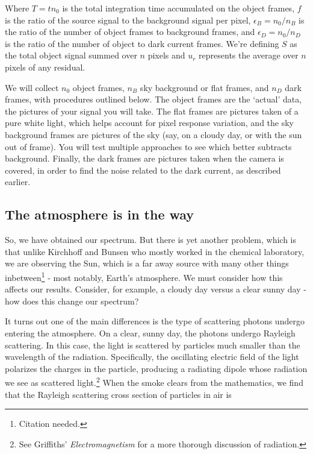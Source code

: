 \documentclass{../lab}
\begin{document}
Where $T=tn_0$ is the total integration time accumulated on the object frames, $f$ is the ratio of the source signal to the background signal per pixel, $\epsilon_B=n_0/n_B$ is the ratio of the number of object frames to background frames, and $\epsilon_D=n_0/n_D$ is the ratio of the number of object to dark current frames. We're defining $S$ as the total object signal summed over $n$ pixels and $u_r$ represents the average over $n$ pixels of any residual.

We will collect $n_0$ object frames, $n_B$ sky background or flat frames, and $n_D$ dark frames, with procedures outlined below. The object frames are the `actual' data, the pictures of your signal you will take. The flat frames are pictures taken of a pure white light, which helps account for pixel response variation, and the sky background frames are pictures of the sky (say, on a cloudy day, or with the sun out of frame). You will test multiple approaches to see which better subtracts background. Finally, the dark frames are pictures taken when the camera is covered, in order to find the noise related to the dark current, as described earlier.

\subsection{The atmosphere is in the way}

So, we have obtained our spectrum. But there is yet another problem, which is that unlike Kirchhoff and Bunsen who mostly worked in the chemical laboratory, we are observing the Sun, which is a far away source with many other things inbetween\footnote{Citation needed.} - most notably, Earth's atmosphere. We must consider how this affects our results. Consider, for example, a cloudy day versus a clear sunny day - how does this change our spectrum?

It turns out one of the main differences is the type of scattering photons undergo entering the atmosphere. On a clear, sunny day, the photons undergo Rayleigh scattering. In this case, the light is scattered by particles much smaller than the wavelength of the radiation. Specifically, the oscillating electric field of the light polarizes the charges in the particle, producing a radiating dipole whose radiation we see as scattered light.\footnote{See Griffiths' \textit{Electromagnetism} for a more thorough discussion of radiation.} When the smoke clears from the mathematics, we find that the Rayleigh scattering cross section of particles in air is
\end{document}
